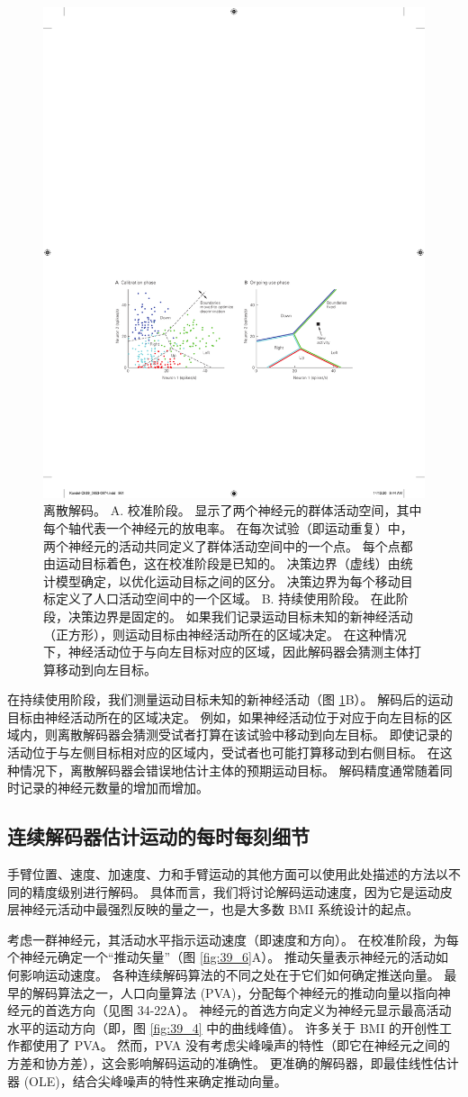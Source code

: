 \begin{figure}[htbp]
	\centering
	\includegraphics[width=0.5\linewidth]{chap39/fig_39_5}
	\caption{离散解码。 
		A. 校准阶段。 
		显示了两个神经元的群体活动空间，其中每个轴代表一个神经元的放电率。
		在每次试验（即运动重复）中，两个神经元的活动共同定义了群体活动空间中的一个点。 
		每个点都由运动目标着色，这在校准阶段是已知的。 
		决策边界（虚线）由统计模型确定，以优化运动目标之间的区分。 
		决策边界为每个移动目标定义了人口活动空间中的一个区域。 
		B. 持续使用阶段。 
		在此阶段，决策边界是固定的。 
		如果我们记录运动目标未知的新神经活动（正方形），则运动目标由神经活动所在的区域决定。 
		在这种情况下，神经活动位于与向左目标对应的区域，因此解码器会猜测主体打算移动到向左目标。}
	\label{fig:39_5}
\end{figure}



在持续使用阶段，我们测量运动目标未知的新神经活动（图 \ref{fig:39_5}B）。 
解码后的运动目标由神经活动所在的区域决定。 
例如，如果神经活动位于对应于向左目标的区域内，则离散解码器会猜测受试者打算在该试验中移动到向左目标。 
即使记录的活动位于与左侧目标相对应的区域内，受试者也可能打算移动到右侧目标。 
在这种情况下，离散解码器会错误地估计主体的预期运动目标。 
解码精度通常随着同时记录的神经元数量的增加而增加。


\subsection{连续解码器估计运动的每时每刻细节}
手臂位置、速度、加速度、力和手臂运动的其他方面可以使用此处描述的方法以不同的精度级别进行解码。 
具体而言，我们将讨论解码运动速度，因为它是运动皮层神经元活动中最强烈反映的量之一，也是大多数 BMI 系统设计的起点。


考虑一群神经元，其活动水平指示运动速度（即速度和方向）。 
在校准阶段，为每个神经元确定一个“推动矢量”（图 \ref{fig:39_6}A）。 
推动矢量表示神经元的活动如何影响运动速度。 各种连续解码算法的不同之处在于它们如何确定推送向量。 
最早的解码算法之一，人口向量算法 (PVA)，分配每个神经元的推动向量以指向神经元的首选方向（见图 34-22A）。 神经元的首选方向定义为神经元显示最高活动水平的运动方向（即，图 \ref{fig:39_4} 中的曲线峰值）。 
许多关于 BMI 的开创性工作都使用了 PVA。 
然而，PVA 没有考虑尖峰噪声的特性（即它在神经元之间的方差和协方差），这会影响解码运动的准确性。 
更准确的解码器，即最佳线性估计器 (OLE)，结合尖峰噪声的特性来确定推动向量。

